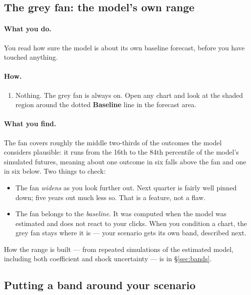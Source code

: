 \documentclass[11pt]{article}
\theoremstyle{definition}
\theoremstyle{remark}
\begin{document}
\subsection{The grey fan: the model's own range}

\paragraph{What you do.} You read how sure the model is about its own baseline forecast,
before you have touched anything.

\paragraph{How.}
\begin{enumerate}
  \item Nothing. The grey fan is always on. Open any chart and look at the shaded
    region around the dotted \textbf{Baseline} line in the forecast area.
\end{enumerate}

\paragraph{What you find.} The fan covers roughly the middle two-thirds of the outcomes
the model considers plausible: it runs from the 16th to the 84th percentile of the
model's simulated futures, meaning about one outcome in six falls above the fan and one
in six below. Two things to check:
\begin{itemize}
  \item The fan \emph{widens} as you look further out. Next quarter is fairly
    well pinned down; five years out much less so. That is a feature, not a flaw.
  \item The fan belongs to the \emph{baseline}. It was computed when the model was
    estimated and does not react to your clicks. When you condition a chart, the grey
    fan stays where it is --- your scenario gets its own band, described next.
\end{itemize}
How the range is built --- from repeated simulations of the estimated model, including
both coefficient and shock uncertainty --- is in \S\ref{sec:bands}.

\subsection{Putting a band around your scenario}
\end{document}
